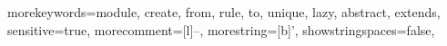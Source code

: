 {morekeywords={module, create, from, rule, to, unique, lazy, abstract, extends},
sensitive=true,
morecomment=[l]{--},
morestring=[b]',
showstringspaces=false,
}